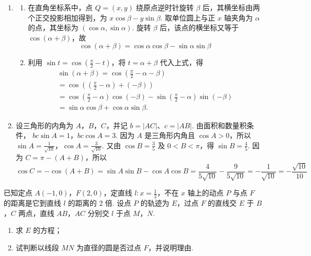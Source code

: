 \begin{solution}
\begin{enumerate}
\item
\begin{enumerate}
\item 在直角坐标系中，点 \(Q=(x,y)\) 绕原点逆时针旋转 \(\beta\) 后，其横坐标由两个正交投影相加得到，为 \(x\cos\beta-y\sin\beta\). 取单位圆上与正 \(x\) 轴夹角为 \(\alpha\) 的点，其坐标为 \((\cos\alpha,\sin\alpha)\). 旋转 \(\beta\) 后，该点的横坐标又等于 \(\cos(\alpha+\beta)\)，故
\[
\cos(\alpha+\beta)=\cos\alpha\cos\beta-\sin\alpha\sin\beta
\]
\item 利用 \(\sin t=\cos\left(\frac\pi2-t\right)\)，将 \(t=\alpha+\beta\) 代入上式，得
\[
\begin{gathered}
\sin(\alpha+\beta)=\cos\left(\frac\pi2-\alpha-\beta\right)\\
=\cos\left(\left(\frac\pi2-\alpha\right)+(-\beta)\right)\\
=\cos\left(\frac\pi2-\alpha\right)\cos(-\beta)-\sin\left(\frac\pi2-\alpha\right)\sin(-\beta)\\
=\sin\alpha\cos\beta+\cos\alpha\sin\beta.
\end{gathered}
\]
\end{enumerate}
\item 设三角形的内角为 \(A\)，\(B\)，\(C\)，并记 \(b=|AC|\)、\(c=|AB|\). 由面积和数量积条件，
\(bc\sin A=1\)，\(bc\cos A=3\).
因为 \(A\) 是三角形内角且 \(\cos A>0\)，所以
\(\sin A=\frac1{\sqrt{10}}\)，\(\cos A=\frac3{\sqrt{10}}\).
又由 \(\cos B=\frac35\) 及 \(0<B<\pi\)，得 \(\sin B=\frac45\). 因为 \(C=\pi-(A+B)\)，所以
\[
\cos C=-\cos(A+B)=\sin A\sin B-\cos A\cos B
=\frac4{5\sqrt{10}}-\frac9{5\sqrt{10}}
=-\frac1{\sqrt{10}}=-\frac{\sqrt{10}}{10}
\]
\end{enumerate}
\end{solution}

\begin{problem}
已知定点 \(A(-1,0)\)，\(F(2,0)\)，定直线 \(l: x = \frac{1}{2}\)，不在 \(x\) 轴上的动点 \(P\) 与点 \(F\) 的距离是它到直线 \(l\) 的距离的 \(2\) 倍. 设点 \(P\) 的轨迹为 \(E\)，过点 \(F\) 的直线交 \(E\) 于 \(B\)，\(C\) 两点，直线 \(AB\)，\(AC\) 分别交 \(l\) 于点 \(M\)，\(N\).
\begin{enumerate}
\item 求 \(E\) 的方程；
\item 试判断以线段 \(MN\) 为直径的圆是否过点 \(F\)，并说明理由.
\end{enumerate}
\end{problem}

